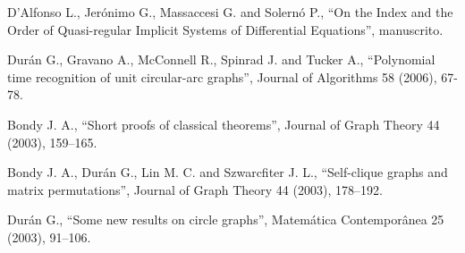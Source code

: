 \item D'Alfonso L., Jer\'onimo G., Massaccesi G. and Solern\'o P.,
``On the Index and the Order of Quasi-regular Implicit Systems of
Differential Equations'', manuscrito.

\item Dur\'an G., Gravano A., McConnell R., Spinrad J. and Tucker
A., ``Polynomial time recognition of unit circular-arc graphs'',
Journal of Algorithms 58 (2006), 67-78.

\item Bondy J. A., ``Short proofs of classical theorems'', Journal
of Graph Theory 44 (2003), 159--165.

\item Bondy J. A., Dur\'an G., Lin M. C. and Szwarcfiter J. L.,
``Self-clique graphs and matrix permutations'', Journal of Graph
Theory 44 (2003), 178--192.

\item Dur\'an G., ``Some new results on circle graphs'',
Matem\'atica Contempor\^anea 25 (2003), 91--106.
